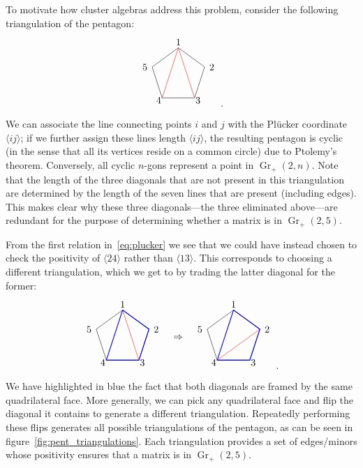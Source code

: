 \documentclass[11pt]{article}
\DeclareMathOperator{\Gr}{Gr}
\def\ket#1{\langle #1 \rangle}
\def\drawLabeledPentagon{
\coordinate (P1) at (90:1);
\coordinate (P2) at (18:1);
\coordinate (P3) at (306:1);
\coordinate (P4) at (234:1);
\coordinate (P5) at (162:1);
\draw (P1) -- (P2) -- (P3) -- (P4) -- (P5) -- cycle;
\draw (0,1.2) node {1};
\draw (1,.3) node[anchor=west] {2};
\draw (.5,-.9) node[anchor=west] {3};
\draw (-.5,-.9) node[anchor=east] {4};
\draw (-1,.3) node[anchor=east] {5};
}
\begin{document}
To motivate how cluster algebras address this problem, consider the following triangulation of the pentagon:
\begin{equation} \label{eq:pent_triangulation}
\begin{tikzpicture}
  \drawLabeledPentagon
  \draw[color=red] (P1) -- (P3);
  \draw[color=red] (P1) -- (P4);
\end{tikzpicture} \ .
\end{equation}
We can associate the line connecting points $i$ and $j$ with the Pl\"ucker coordinate $\ket{ij}$; if we further assign these lines length $\ket{ij}$, the resulting pentagon is cyclic (in the sense that all its vertices reside on a common circle) due to Ptolemy's theorem. Conversely, all cyclic $n$-gons represent a point in $\Gr_+(2,n)$. Note that the length of the three diagonals that are not present in this triangulation are determined by the length of the seven lines that are present (including edges). This makes clear why these three diagonals---the three eliminated above---are redundant for the purpose of determining whether a matrix is in $\Gr_+(2,5)$. 

From the first relation in~\eqref{eq:plucker} we see that we could have instead chosen to check the positivity of $\ket{24}$ rather than $\ket{13}$. This corresponds to choosing a different triangulation, which we get to by trading the latter diagonal for the former:
\begin{equation}
\begin{tikzpicture}
  \drawLabeledPentagon
  \draw[color=blue, thick] (P1) -- (P2) -- (P3) -- (P4) -- cycle;
  \draw[color=red] (P1) -- (P3);
  \draw (2,0) node {$\Rightarrow$};
\begin{scope}[xshift = 4cm]
  \drawLabeledPentagon
  \draw[color=blue, thick] (P1) -- (P2) -- (P3) -- (P4) -- cycle;
  \draw[color=red] (P2) -- (P4);
\end{scope}
\end{tikzpicture}  \ .
\end{equation}
We have highlighted in blue the fact that both diagonals are framed by the same quadrilateral face. More generally, we can pick any quadrilateral face and flip the diagonal it contains to generate a different triangulation. Repeatedly performing these flips generates all possible triangulations of the pentagon, as can be seen in figure~\ref{fig:pent_triangulations}. Each triangulation provides a set of edges/minors whose positivity ensures that a matrix is in $\Gr_+(2,5)$. 
\end{document}
